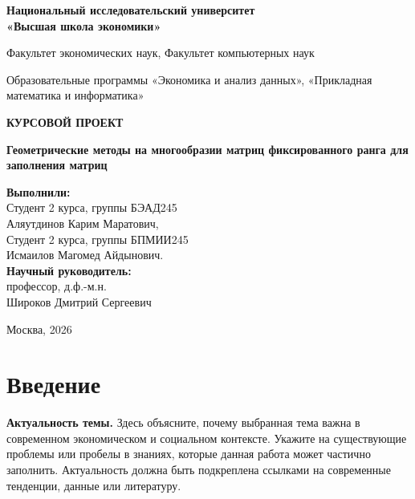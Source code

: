 \documentclass[a4paper,12pt]{article}
\begin{document}
\begin{titlepage}
    \centering
    {\large\bfseries Национальный исследовательский университет \\ «Высшая школа экономики»\par}
    \vspace{1cm}
    {\large Факультет экономических наук, Факультет компьютерных наук\par}
    {\large Образовательные программы «Экономика и анализ данных», «Прикладная математика и информатика»\par}
    \vspace{2cm}
    {\Large\bfseries КУРСОВОЙ ПРОЕКТ\par}
    \vspace{1cm}
    {\Large\bfseries Геометрические методы на многообразии матриц фиксированного ранга для заполнения матриц \par}
    \vspace{2cm}
    \begin{flushright}
        \large
        \textbf{Выполнили:}\\
        Студент 2 курса, группы БЭАД245\\
        Аляутдинов Карим Маратович,\\
        Студент 2 курса, группы БПМИИ245\\
        Исмаилов Магомед Айдынович.\\
        \vspace{0.5cm}
        \textbf{Научный руководитель:}\\
        профессор, д.ф.-м.н.\\
        Широков Дмитрий Сергеевич\\
    \end{flushright}
    \vfill
    {\large Москва, 2026\par}
\end{titlepage}

\tableofcontents
\newpage

\section*{Введение}

\textbf{Актуальность темы.} Здесь объясните, почему выбранная тема важна в современном экономическом и социальном контексте. Укажите на существующие проблемы или пробелы в знаниях, которые данная работа может частично заполнить. Актуальность должна быть подкреплена ссылками на современные тенденции, данные или литературу.
\end{document}
